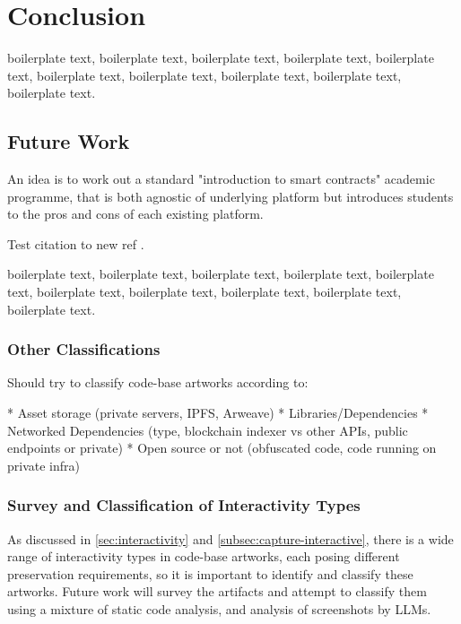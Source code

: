 \chapter{Conclusion}


boilerplate text, boilerplate text, boilerplate text, boilerplate text, boilerplate text, boilerplate text, boilerplate text, boilerplate text, boilerplate text, boilerplate text.


\section{Future Work}


An idea is to work out a standard "introduction to smart contracts" academic programme, that is both agnostic of underlying platform but introduces students to the pros and cons of each existing platform.

Test citation to new ref  \cite{dekkerCollectingConservingNet2018}.

boilerplate text, boilerplate text, boilerplate text, boilerplate text, boilerplate text, boilerplate text, boilerplate text, boilerplate text, boilerplate text, boilerplate text.


\subsection{Other Classifications}

Should try to classify code-base artworks according to:

* Asset storage (private servers, IPFS, Arweave)
* Libraries/Dependencies
* Networked Dependencies (type, blockchain indexer vs other APIs, public endpoints or private)
* Open source or not (obfuscated code, code running on private infra)



\subsection{Survey and Classification of Interactivity Types}

As discussed in \autoref{sec:interactivity} and \autoref{subsec:capture-interactive}, there is a wide range of interactivity types in code-base artworks, each posing different preservation requirements, so it is important to identify and classify these artworks. Future work will survey the artifacts and attempt to classify them using a mixture of static code analysis, and analysis of screenshots by LLMs.


